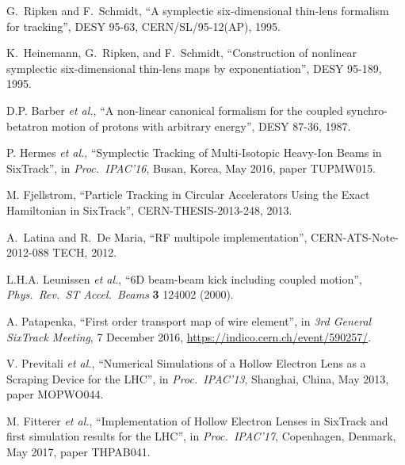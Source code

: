 \documentclass{ws-ijmpa}
\begin{document}
\begin{thebibliography}{99}
G.~Ripken and F.~Schmidt,
``A symplectic six-dimensional thin-lens formalism for tracking'',
DESY 95-63, CERN/SL/95-12(AP), 1995.

K.~Heinemann, G.~Ripken, and F.~Schmidt,
``Construction of nonlinear symplectic six-dimensional thin-lens maps by exponentiation'',
DESY 95-189, 1995.

D.P. Barber {\it et al.},
``A non-linear canonical formalism for the coupled synchro-betatron motion of protons with arbitrary energy'',
DESY 87-36, 1987.

 P. Hermes {\it et al.},
``Symplectic Tracking of Multi-Isotopic Heavy-Ion Beams in SixTrack'', in \textit{Proc.~IPAC'16}, Busan, Korea, May 2016, paper TUPMW015.

M. Fjellstrom, ``Particle Tracking in Circular Accelerators Using the Exact Hamiltonian in SixTrack'', CERN-THESIS-2013-248, 2013.

A.~Latina and R.~De Maria, ``RF multipole implementation'', CERN-ATS-Note-2012-088 TECH, 2012.

L.H.A. Leunissen {\it et al.}, ``6D beam-beam kick including coupled motion'', {\it Phys.\ Rev.\ ST Accel.\ Beams} {\bf 3} 124002 (2000).

A. Patapenka,
``First order transport map of wire element'',
in \textit{3rd General SixTrack Meeting}, 7 December 2016, \url{https://indico.cern.ch/event/590257/}.

V. Previtali {\it et al.},
``Numerical Simulations of a Hollow Electron Lens as a Scraping Device for the LHC'',
in \textit{Proc.~IPAC'13}, Shanghai, China, May 2013, paper MOPWO044.


M. Fitterer {\it et al.},
``Implementation of Hollow Electron Lenses in SixTrack and first simulation results for the LHC'',
in \textit{Proc.~IPAC'17}, Copenhagen, Denmark, May 2017, paper THPAB041.




\end{thebibliography}
\end{document}
